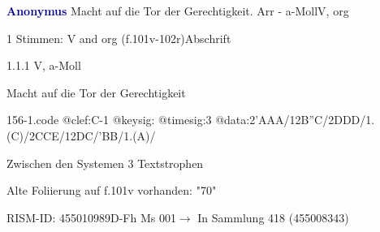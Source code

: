 \documentclass[twocolumn, 12pt]{book}
\begin{document}
\par \vspace{16pt} \textcolor{darkblue}{\textbf{Anonymus  }}\hfillplus{\textbf{[156]}}\newline Macht auf die Tor der Gerechtigkeit. Arr - a-Moll\newline V, org
\par \begin{itshape}\end{itshape} 
\par \textcolor{darkblue}{}  1 Stimmen: V and org  (f.101v-102r)\newline Abschrift
\par 1.1.1  V, a-Moll\newline \begin{footnotesize} Macht auf die Tor der Gerechtigkeit \end{footnotesize}  
\begin{filecontents*}{156-1.code}
@clef:C-1
@keysig:
@timesig:3
@data:2'AAA/12B''C/2DDD/1.(C)/2CCE/12DC/'BB/1.(A)/
\end{filecontents*}
\newline %
\par Zwischen den Systemen 3 Textstrophen
\par Alte Foliierung auf f.101v vorhanden: "70"
\par RISM-ID: 455010989\newline D-Fh  Ms 001\newline $\rightarrow$ In Sammlung 418 (455008343)
      
\end{document}
